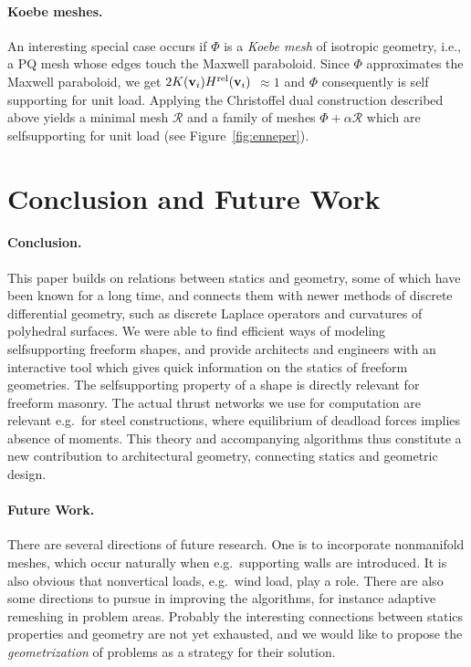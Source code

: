 \documentclass[review]{acmsiggraph}
\def\rel{{\mathord{{\rm rel}}}}
\def\RR{{\mathcal R}}
\begin{document}
\paragraph{Koebe meshes.}

An interesting special case occurs if $\Phi$ is a {\it Koebe 
mesh} of isotropic geometry,
i.e., a PQ mesh whose edges touch the Maxwell paraboloid. Since 
$\Phi$ approximates the Maxwell paraboloid, we get 
$2K(\vw_i)H^{\rel}(\vw_i)$ $ \approx 1$ and $\Phi$ consequently is self\dash 
supporting for unit load. Applying the Christoffel dual construction 
described above yields a minimal mesh $\RR$ and a family of 
meshes $\Phi+\alpha\RR$ which are self\dash supporting for unit load
(see Figure~\ref{fig:enneper}).


\section{Conclusion and Future Work}

\paragraph{Conclusion.}

This paper builds on relations between statics and geometry, some of
which have been known for a long time, and connects them with newer
methods of discrete differential geometry, such as discrete Laplace
operators and curvatures of polyhedral surfaces. We were able to find
efficient ways of modeling self\dash supporting freeform shapes,
and provide architects and engineers with an interactive tool which
gives quick information on the statics of freeform geometries.
The self\dash supporting property of a shape is directly relevant for
freeform masonry. The actual thrust networks we use for computation
are relevant e.g.\ for steel constructions, where equilibrium of deadload
forces implies absence of moments. This theory and accompanying
algorithms thus constitute a new contribution to architectural
geometry, connecting statics and
geometric design.

\paragraph{Future Work.}

There are several directions of future research. One is to 
incorporate non\dash manifold meshes, which occur naturally when e.g.\
supporting walls are introduced. It is also obvious that non\dash vertical
loads, e.g.\ wind load, play a role. There are also some directions to
pursue in improving the algorithms, for instance adaptive remeshing
in problem areas. Probably the interesting connections between statics
properties and geometry are not yet exhausted, and we would like to
propose the {\em geometrization} of problems as a strategy for their
solution.
\end{document}
